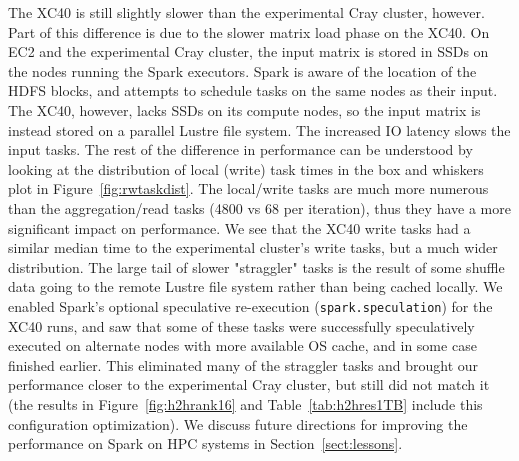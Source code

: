 The XC40 is still slightly slower than the experimental Cray cluster, however.
Part of this difference is due to the slower matrix load phase on the XC40.  On
EC2 and the experimental Cray cluster, the input matrix is stored in SSDs on
the nodes running the Spark executors.  Spark is aware of the location of the
HDFS blocks, and attempts to schedule tasks on the same nodes as their input.
The XC40, however, lacks SSDs on its compute nodes, so the input matrix is
instead stored on a parallel Lustre file system.  The increased IO latency
slows the input tasks. The rest of the difference in performance can be
understood by looking at the distribution of local (write) task times in the
box and whiskers plot in Figure~\ref{fig:rwtaskdist}.  The local/write tasks
are much more numerous than the aggregation/read tasks (4800 vs 68 per
iteration), thus they have a more significant impact on performance.  We see
that the XC40 write tasks had a similar median time to the experimental
cluster's write tasks, but a much wider distribution.  The large tail of slower
"straggler" tasks is the result of some shuffle data going to the remote Lustre
file system rather than being cached locally. We enabled Spark's optional
speculative re-execution (\texttt{spark.speculation}) for the XC40 runs, and
saw that some of these tasks were successfully speculatively executed on
alternate nodes with more available OS cache, and in some case finished
earlier.  This eliminated many of the straggler tasks and brought our
performance closer to the experimental Cray cluster, but still did not match it
(the results in Figure~\ref{fig:h2hrank16} and Table~\ref{tab:h2hres1TB}
include this configuration optimization).  We discuss future directions for
improving the performance on Spark on HPC systems in
Section~\ref{sect:lessons}.
